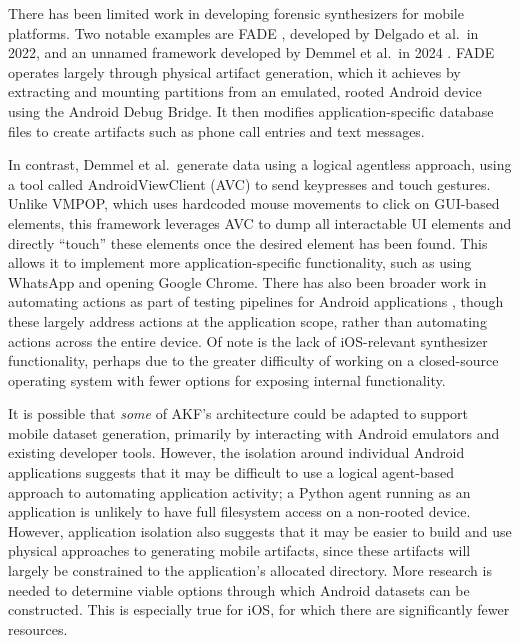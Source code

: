 There has been limited work in developing forensic synthesizers for
mobile platforms. Two notable examples are FADE
\cite{ceballosdelgadoFADEForensicImage2022}, developed by Delgado et
al.~in 2022, and an unnamed framework developed by Demmel et al.~in 2024
\cite{demmelDataSynthesisGoing2024}. FADE operates largely through
physical artifact generation, which it achieves by extracting and
mounting partitions from an emulated, rooted Android device using the
Android Debug Bridge. It then modifies application-specific database
files to create artifacts such as phone call entries and text messages.

In contrast, Demmel et al.~generate data using a logical agentless
approach, using a tool called AndroidViewClient (AVC) to send keypresses
and touch gestures. Unlike VMPOP, which uses hardcoded mouse movements
to click on GUI-based elements, this framework leverages AVC to dump all
interactable UI elements and directly ``touch'' these elements once the
desired element has been found. This allows it to implement more
application-specific functionality, such as using WhatsApp and opening
Google Chrome. There has also been broader work in automating actions as
part of testing pipelines for Android applications
\cite{janickiObstaclesOpportunitiesDeploying2012,nagowahNovelApproachAutomation2012,linares-vasquezHowDevelopersTest2017},
though these largely address actions at the application scope, rather
than automating actions across the entire device. Of note is the lack of
iOS-relevant synthesizer functionality, perhaps due to the greater
difficulty of working on a closed-source operating system with fewer
options for exposing internal functionality.

It is possible that \emph{some} of AKF's architecture could be adapted
to support mobile dataset generation, primarily by interacting with
Android emulators and existing developer tools. However, the isolation
around individual Android applications suggests that it may be difficult
to use a logical agent-based approach to automating application
activity; a Python agent running as an application is unlikely to have
full filesystem access on a non-rooted device. However, application
isolation also suggests that it may be easier to build and use physical
approaches to generating mobile artifacts, since these artifacts will
largely be constrained to the application's allocated directory. More
research is needed to determine viable options through which Android
datasets can be constructed. This is especially true for iOS, for which
there are significantly fewer resources.
